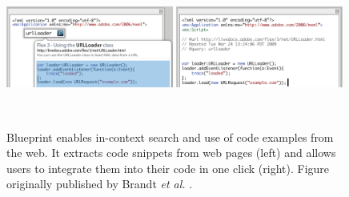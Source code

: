 \begin{figure}[b!]
\centering
  \includegraphics[width=0.49\textwidth]{figures/blueprint1.png}
  \hfill
  \includegraphics[width=0.49\textwidth]{figures/blueprint2.png}
  \caption{Blueprint enables in-context search and use of code examples from the web. It extracts code snippets from web pages (left) and allows users to integrate them into their code in one click (right).  Figure originally published by Brandt \textit{et al.} \cite{Brandt2010}.}~\label{fig:intro_blueprint}
\end{figure}

